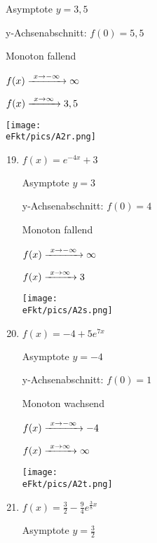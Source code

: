 \begin{Answer}[ref=eFktA2]
\begin{minipage}{\textwidth}
\begin{minipage}{0.5\textwidth}
\begin{enumerate}[label=\alph*)]
				Asymptote \(y=3,5\)

				y-Achsenabschnitt: \(f(0)=5,5\)

				Monoton fallend

				\(f(x)\xrightarrow{\hphantom{\ }x\to-\infty\hphantom{\ }}\infty\)

				\(f(x)\xrightarrow{\hphantom{\ }x\to\infty\hphantom{\ }}3,5\)

				\texttt{[image: \\eFkt/pics/A2r.png]}
			\end{enumerate}
		\end{minipage}%
		\begin{minipage}{0.5\textwidth}
			\begin{enumerate}[label=\alph*)]
				\setcounter{enumi}{18}
				\item \(f(x)=e^{-4x}+3\)

				Asymptote \(y=3\)

				y-Achsenabschnitt: \(f(0)=4\)

				Monoton fallend

				\(f(x)\xrightarrow{\hphantom{\ }x\to-\infty\hphantom{\ }}\infty\)

				\(f(x)\xrightarrow{\hphantom{\ }x\to\infty\hphantom{\ }}3\)

				\texttt{[image: \\eFkt/pics/A2s.png]}
				\item \(f(x)=-4+5e^{7x}\)

				Asymptote \(y=-4\)

				y-Achsenabschnitt: \(f(0)=1\)

				Monoton wachsend

				\(f(x)\xrightarrow{\hphantom{\ }x\to-\infty\hphantom{\ }}-4\)

				\(f(x)\xrightarrow{\hphantom{\ }x\to\infty\hphantom{\ }}\infty\)

				\texttt{[image: \\eFkt/pics/A2t.png]}
			\end{enumerate}
		\end{minipage}%
	\end{minipage}
	\newpage
	\begin{minipage}{\textwidth}
		\begin{minipage}{0.5\textwidth}
			\begin{enumerate}[label=\alph*)]
				\setcounter{enumi}{20}
				\item \(f(x)=\frac{3}{2}-\frac{9}{4}e^{\frac{3}{8}x}\)

				Asymptote \(y=\frac{3}{2}\)


\end{enumerate}
\end{minipage}
\end{minipage}
\end{Answer}
